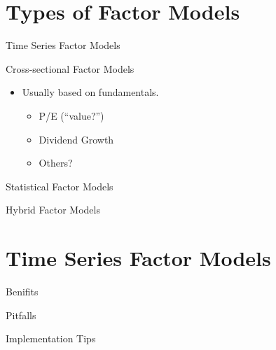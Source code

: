 \section{Types of Factor Models}\label{types-of-factor-models}

\begin{frame}{Time Series Factor Models}

\end{frame}

\begin{frame}{Cross-sectional Factor Models}

\begin{itemize}
\itemsep1pt\parskip0pt
\item
  Usually based on fundamentals.

  \begin{itemize}
  \itemsep1pt\parskip0pt
  \item
    P/E (``value?'')
  \item
    Dividend Growth
  \item
    Others?
  \end{itemize}
\end{itemize}

\end{frame}

\begin{frame}{Statistical Factor Models}

\end{frame}

\begin{frame}{Hybrid Factor Models}

\end{frame}

\section{Time Series Factor Models}\label{time-series-factor-models-1}

\begin{frame}{Benifits}

\end{frame}

\begin{frame}{Pitfalls}

\end{frame}

\begin{frame}{Implementation Tips}

\end{frame}


